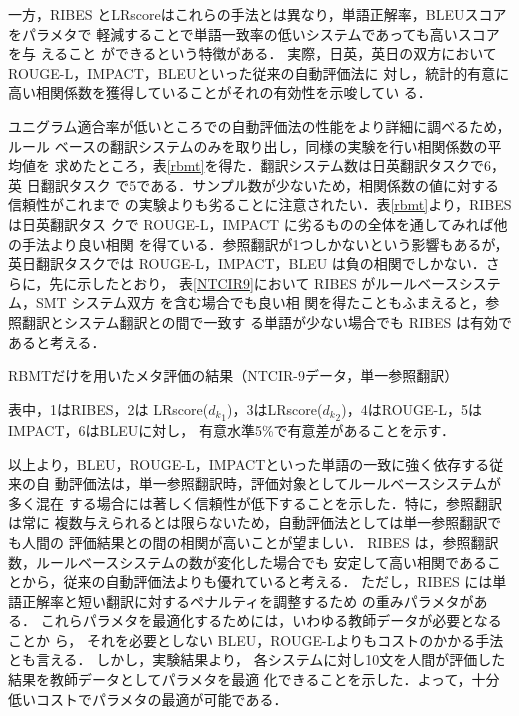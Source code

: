 \documentclass[japanese]{jnlp_1.4}
\begin{document}
一方，RIBES とLRscoreはこれらの手法とは異なり，単語正解率，BLEUスコアをパラメタで
軽減することで単語一致率の低いシステムであっても高いスコアを与
えること
ができるという特徴がある．
実際，日英，英日の双方においてROUGE-L，IMPACT，BLEUといった従来の自動評価法に
対し，統計的有意に高い相関係数を獲得していることがそれの有効性を示唆してい
る．

ユニグラム適合率が低いところでの自動評価法の性能をより詳細に調べるため，
ルール
ベースの翻訳システムのみを取り出し，同様の実験を行い相関係数の平均値を
求めたところ，表\ref{rbmt}を得た．翻訳システム数は日英翻訳タスクで6，英
日翻訳タスク
で5である．サンプル数が少ないため，相関係数の値に対する信頼性がこれまで
の実験よりも劣ることに注意されたい．表\ref{rbmt}より，RIBES は日英翻訳タス
クで ROUGE-L，IMPACT に劣るものの全体を通してみれば他の手法より良い相関
を得ている．参照翻訳が1つしかないという影響もあるが，英日翻訳タスクでは
ROUGE-L，IMPACT，BLEU は負の相関でしかない．さらに，先に示したとおり，
表\ref{NTCIR9}において RIBES がルールベースシステム，SMT システム双方
を含む場合でも良い相
関を得たこともふまえると，参照翻訳とシステム翻訳との間で一致す
る単語が少ない場合でも RIBES は有効であると考える．

\begin{table}[b]
  \caption{RBMTだけを用いたメタ評価の結果（NTCIR-9データ，単一参照翻訳）}
  \label{rbmt}

\vspace{4pt}\small
  表中，1はRIBES，2は
  LRscore(${d_k}_1$)，3はLRscore(${d_k}_2$)，4はROUGE-L，5はIMPACT，6はBLEUに対し，
  有意水準5\%で有意差があることを示す．
\par
\end{table}

以上より，BLEU，ROUGE-L，IMPACTといった単語の一致に強く依存する従来の自
動評価法は，単一参照翻訳時，評価対象としてルールベースシステムが多く混在
する場合には著しく信頼性が低下することを示した．特に，参照翻訳は常に
複数与えられるとは限らないため，自動評価法としては単一参照翻訳でも人間の
評価結果との間の相関が高いことが望ましい．
RIBES は，参照翻訳数，ルールベースシステムの数が変化した場合でも
安定して高い相関であることから，従来の自動評価法よりも優れていると考える．
ただし，RIBES には単語正解率と短い翻訳に対するペナルティを調整するため
の重みパラメタがある．
これらパラメタを最適化するためには，いわゆる教師データが必要となることか
ら，
それを必要としない BLEU，ROUGE-Lよりもコストのかかる手法とも言える．
しかし，実験結果より，
各システムに対し10文を人間が評価した結果を教師データとしてパラメタを最適
化できることを示した．よって，十分低いコストでパラメタの最適が可能である．
\end{document}
